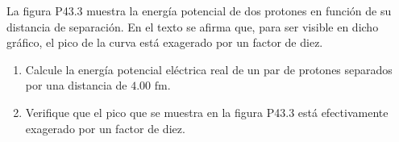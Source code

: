 \item La figura P43.3 muestra la energía potencial de dos protones en función de su distancia de separación. En el texto se afirma que, para ser visible en dicho gráfico, el pico de la curva está exagerado por un factor de diez.
\begin{enumerate}
    \item Calcule la energía potencial eléctrica real de un par de protones separados por una distancia de $4.00\text{ fm}$.
    \item Verifique que el pico que se muestra en la figura P43.3 está efectivamente exagerado por un factor de diez.
\end{enumerate}